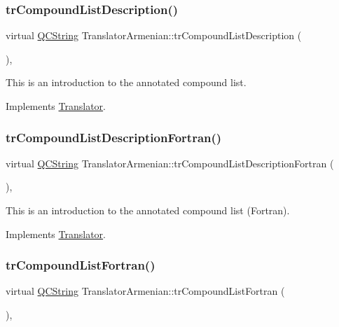\subsubsection{\texorpdfstring{trCompoundListDescription()}{trCompoundListDescription()}}
{\footnotesize\ttfamily virtual \mbox{\hyperlink{class_q_c_string}{Q\+C\+String}} Translator\+Armenian\+::tr\+Compound\+List\+Description (\begin{DoxyParamCaption}{ }\end{DoxyParamCaption})\hspace{0.3cm}{\ttfamily [inline]}, {\ttfamily [virtual]}}

This is an introduction to the annotated compound list. 

Implements \mbox{\hyperlink{class_translator}{Translator}}.

\mbox{\label{class_translator_armenian_a72b5c917a7303dc039d53aa494cb7ac1}} 
\subsubsection{\texorpdfstring{trCompoundListDescriptionFortran()}{trCompoundListDescriptionFortran()}}
{\footnotesize\ttfamily virtual \mbox{\hyperlink{class_q_c_string}{Q\+C\+String}} Translator\+Armenian\+::tr\+Compound\+List\+Description\+Fortran (\begin{DoxyParamCaption}{ }\end{DoxyParamCaption})\hspace{0.3cm}{\ttfamily [inline]}, {\ttfamily [virtual]}}

This is an introduction to the annotated compound list (Fortran). 

Implements \mbox{\hyperlink{class_translator}{Translator}}.

\mbox{\label{class_translator_armenian_a2d83c0f6269129eb8f01b1e330fa3597}} 
\subsubsection{\texorpdfstring{trCompoundListFortran()}{trCompoundListFortran()}}
{\footnotesize\ttfamily virtual \mbox{\hyperlink{class_q_c_string}{Q\+C\+String}} Translator\+Armenian\+::tr\+Compound\+List\+Fortran (\begin{DoxyParamCaption}{ }\end{DoxyParamCaption})\hspace{0.3cm}{\ttfamily [inline]}, {\ttfamily [virtual]}}

